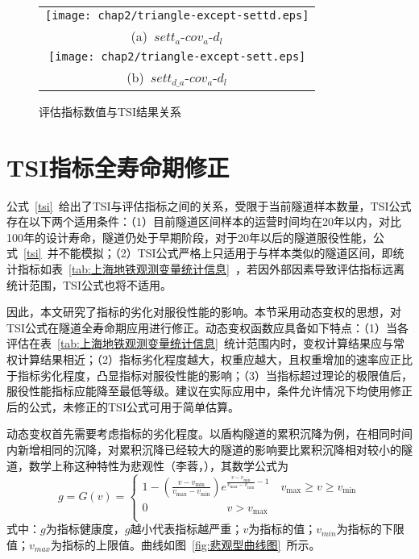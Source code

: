 \begin{figure}[htbp!] 
    \centering 
    \begin{tabular}{c}
        \texttt{[image: chap2/triangle-except-settd.eps]} \\ 
        (a)~${sett}_{a}$-$cov_a$-$d_l$ \\
        \texttt{[image: chap2/triangle-except-sett.eps]} \\ 
        (b)~$set{{t}_{d\_a}}$-$cov_a$-$d_l$ \\
    \end{tabular}
    \caption{评估指标数值与TSI结果关系} 
    \label{fig:评估指标数值与TSI结果关系2} 
\end{figure}

\section{TSI指标全寿命期修正}

公式~\ref{tsi}~给出了TSI与评估指标之间的关系，受限于当前隧道样本数量，TSI公式存在以下两个适用条件：（1）目前隧道区间样本的运营时间均在20年以内，对比100年的设计寿命，隧道仍处于早期阶段，对于20年以后的隧道服役性能，公式~\ref{tsi}~并不能模拟；（2）TSI公式严格上只适用于与样本类似的隧道区间，即统计指标如表~\ref{tab:上海地铁观测变量统计信息}~，若因外部因素导致评估指标远离统计范围，TSI公式也将不适用。

因此，本文研究了指标的劣化对服役性能的影响。本节采用动态变权的思想，对TSI公式在隧道全寿命期应用进行修正。动态变权函数应具备如下特点：（1）当各评估在表~\ref{tab:上海地铁观测变量统计信息}~统计范围内时，变权计算结果应与常权计算结果相近；（2）指标劣化程度越大，权重应越大，且权重增加的速率应正比于指标劣化程度，凸显指标对服役性能的影响；（3）当指标超过理论的极限值后，服役性能指标应能降至最低等级。建议在实际应用中，条件允许情况下均使用修正后的公式，未修正的TSI公式可用于简单估算。

动态变权首先需要考虑指标的劣化程度。以盾构隧道的累积沉降为例，在相同时间内新增相同的沉降，对累积沉降已经较大的隧道的影响要比累积沉降相对较小的隧道，数学上称这种特性为悲观性（李蓉，\citeyear{李蓉2007基于层次分析法的桥梁健康状态模糊综合评估方法的研究及其应用}），其数学公式为
\begin{equation}
    g=G(v)=\left\{ \begin{matrix}
   1-\left( \frac{v-{{v}_{\min }}}{{{v}_{\max }}-{{v}_{\min }}} \right){{e}^{\frac{v-{{v}_{\min }}}{{{v}_{\max }}-{{v}_{\min }}}-1}}\quad {{v}_{\max }}\ge v\ge {{v}_{\min }}  \\
   0\quad \quad \quad \quad \quad \quad \quad v>{{v}_{\max }}  \\
\end{matrix} \right.
\end{equation}
式中：$g$为指标健康度，$g$越小代表指标越严重；$v$为指标的值；$v_{min}$为指标的下限值；$v_{max}$为指标的上限值。曲线如图~\ref{fig:悲观型曲线图}~所示。

